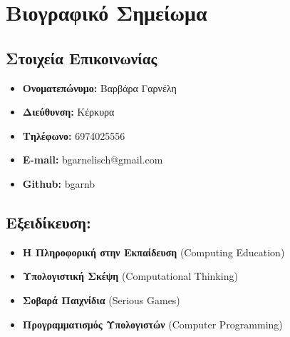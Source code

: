 \documentclass[%
    11pt,
  oneside
  ]{memoir}
\let\oldsection\section
\renewcommand{\section}[1]{%
  \oldsection{#1}
  \leavevmode
  \par
  \vspace{\dimexpr-\baselineskip-\parskip}
}
\begin{document}
      \chapter*{Βιογραφικό Σημείωμα}
  

  \hypertarget{contact-information}{%
  \section{}\label{contact-information}}
    \begin{minipage}[t]{0.3\textwidth}
      
    \end{minipage}
    \begin{minipage}[t]{0.7\textwidth}
                                            \end{minipage}
  \hypertarget{ux3c3ux3c4ux3bfux3b9ux3c7ux3b5ux3afux3b1-ux3b5ux3c0ux3b9ux3baux3bfux3b9ux3bdux3c9ux3bdux3afux3b1ux3c2}{%
\section{Στοιχεία
Επικοινωνίας}\label{ux3c3ux3c4ux3bfux3b9ux3c7ux3b5ux3afux3b1-ux3b5ux3c0ux3b9ux3baux3bfux3b9ux3bdux3c9ux3bdux3afux3b1ux3c2}}

\begin{itemize}
\tightlist
\item
  \textbf{Ονοματεπώνυμο:} Βαρβάρα Γαρνέλη
\item
  \textbf{Διεύθυνση:} Κέρκυρα
\item
  \textbf{Τηλέφωνο:} 6974025556
\item
  \textbf{E-mail:} bgarnelisch@gmail.com
\item
  \textbf{Github:} bgarnb
\end{itemize}

\hypertarget{ux3b5ux3beux3b5ux3b9ux3b4ux3afux3baux3b5ux3c5ux3c3ux3b7}{%
\section{Εξειδίκευση:}\label{ux3b5ux3beux3b5ux3b9ux3b4ux3afux3baux3b5ux3c5ux3c3ux3b7}}

\begin{itemize}
\tightlist
\item
  \textbf{Η Πληροφορική στην Εκπαίδευση} (Computing Education)
\item
  \textbf{Υπολογιστική Σκέψη} (Computational Thinking)
\item
  \textbf{Σοβαρά Παιχνίδια} (Serious Games)
\item
  \textbf{Προγραμματισμός Υπολογιστών} (Computer Programming)
\end{itemize}
\end{document}
